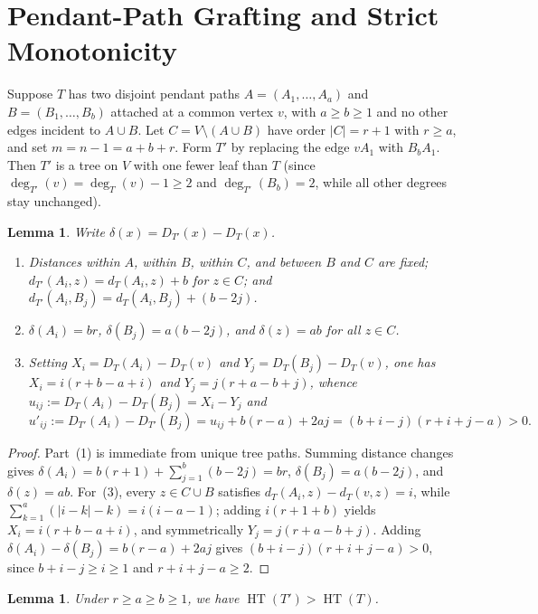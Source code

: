 \documentclass[11pt]{article}
\newtheorem{lemma}[theorem]{Lemma}
\newcommand{\HT}{\operatorname{HT}}
\begin{document}
\section{Pendant-Path Grafting and Strict Monotonicity}

Suppose $T$ has two disjoint pendant paths $A = (A_1, \dots, A_a)$ and $B = (B_1, \dots, B_b)$ attached at a common vertex $v$, with $a \ge b \ge 1$ and no other edges incident to $A \cup B$. Let $C = V \setminus (A \cup B)$ have order $|C| = r + 1$ with $r \ge a$, and set $m = n - 1 = a + b + r$. Form $T'$ by replacing the edge $v A_1$ with $B_b A_1$. Then $T'$ is a tree on $V$ with one fewer leaf than $T$ (since $\deg_{T'}(v) = \deg_T(v) - 1 \ge 2$ and $\deg_{T'}(B_b) = 2$, while all other degrees stay unchanged).

\begin{lemma}\label{lem:shift}
Write $\delta(x) = D_{T'}(x) - D_T(x)$.
\begin{enumerate}
  \item Distances within $A$, within $B$, within $C$, and between $B$ and $C$ are fixed; $d_{T'}(A_i, z) = d_T(A_i, z) + b$ for $z \in C$; and $d_{T'}(A_i, B_j) = d_T(A_i, B_j) + (b - 2j)$.
  \item $\delta(A_i) = br$, $\delta(B_j) = a(b - 2j)$, and $\delta(z) = ab$ for all $z \in C$.
  \item Setting $X_i = D_T(A_i) - D_T(v)$ and $Y_j = D_T(B_j) - D_T(v)$, one has $X_i = i(r + b - a + i)$ and $Y_j = j(r + a - b + j)$, whence $u_{ij} := D_T(A_i) - D_T(B_j) = X_i - Y_j$ and
  \[
    u'_{ij} := D_{T'}(A_i) - D_{T'}(B_j) = u_{ij} + b(r - a) + 2aj = (b + i - j)(r + i + j - a) > 0.
  \]
\end{enumerate}
\end{lemma}

\begin{proof}
Part~(1) is immediate from unique tree paths. Summing distance changes gives $\delta(A_i) = b(r + 1) + \sum_{j=1}^b (b - 2j) = br$, $\delta(B_j) = a(b - 2j)$, and $\delta(z) = ab$. For~(3), every $z \in C \cup B$ satisfies $d_T(A_i, z) - d_T(v, z) = i$, while $\sum_{k=1}^a (|i - k| - k) = i(i - a - 1)$; adding $i(r + 1 + b)$ yields $X_i = i(r + b - a + i)$, and symmetrically $Y_j = j(r + a - b + j)$. Adding $\delta(A_i) - \delta(B_j) = b(r - a) + 2aj$ gives $(b + i - j)(r + i + j - a) > 0$, since $b + i - j \ge i \ge 1$ and $r + i + j - a \ge 2$.
\end{proof}

\begin{lemma}\label{lem:strict}
Under $r \ge a \ge b \ge 1$, we have $\HT(T') > \HT(T)$.
\end{lemma}
\end{document}
